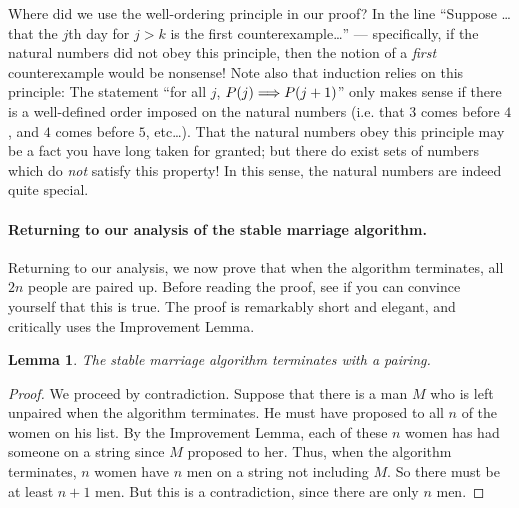 \documentclass[11pt,fleqn]{article}
\newcounter{thm}
\newtheorem{lemma}{Lemma}[thm]
\begin{document}
Where did we use the well-ordering principle in our proof? In the line ``Suppose \ldots that the $j$th
day for $j > k$ is the first counterexample\ldots'' --- specifically, if the natural numbers did not obey this principle, then the notion of a \emph{first} counterexample would be nonsense! Note also that induction relies on this principle: The statement ``for all $j$, $P(j)\Longrightarrow P(j+1)$'' only makes sense if there is a well-defined order imposed on the natural numbers (i.e. that $3$ comes before $4$, and $4$ comes before $5$, etc\ldots). That the natural numbers obey this principle may be a fact you have long taken for granted; but there do exist sets of numbers which do \emph{not} satisfy this property! In this sense, the natural numbers are indeed quite special.

\paragraph{Returning to our analysis of the stable marriage algorithm.} Returning to our analysis, we now prove that when the algorithm terminates, all
$2n$ people are paired up.
Before reading the proof, see if you can convince yourself that
this is true. The proof is remarkably short and elegant, and
critically uses the Improvement Lemma.

\begin{lemma}\label{l:pairing}
    The stable marriage algorithm terminates with a pairing.
\end{lemma}
\begin{proof}
We proceed by contradiction. Suppose that there is a man $M$ who is left
unpaired when the algorithm terminates. He must
have proposed to all $n$ of the women on his list. By the Improvement Lemma,
each of these $n$ women has had
someone on a string since $M$ proposed to her. Thus, when the algorithm terminates,
$n$ women have $n$ men on a
string not including $M$. So there must be at least
$n+1$ men. But this is a contradiction, since there are only $n$ men.
\end{proof}
\end{document}
